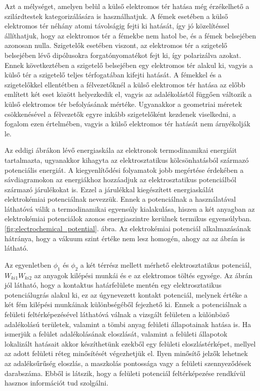Azt a mélységet, amelyen belül a külső elektromos tér hatása még érzékelhető a szilárdtestek kategorizálására is használhatjuk. A fémek esetében a külső elektromos tér néhány atomi távolságig fejti ki hatását, így jó közelítéssel állíthatjuk, hogy az elektromos tér a fémekbe nem hatol be, és a fémek belsejében azonosan nulla. Szigetelők esetében viszont, az elektromos tér a szigetelő belsejében lévő dipólusokra forgatónyomatékot fejt ki, így polarizálva azokat. Ennek következtében a szigetelő belsejében egy elektromos tér alakul ki, vagyis a külső tér a szigetelő teljes térfogatában kifejti hatását. A fémekkel és a szigetelőkkel ellentétben a félvezetőknél a külső elektromos tér hatása az előbb említett két eset között helyezkedik el, vagyis az adalékolástól függően változik a külső elektromos tér befolyásának mértéke. Ugyanakkor a geometriai méretek csökkenésével a félvezetők egyre inkább szigetelőként kezdenek viselkedni, a fogalom ezen értelmében, vagyis a külső elektromos tér hatását nem árnyékolják le.

Az eddigi ábrákon lévő energiaskála az elektronok termodinamikai energiáit tartalmazta, ugyanakkor kihagyta az elektrosztatikus kölcsönhatásból származó potenciális energiát. A kiegyenlítődési folyamatok jobb megértése érdekében a sávdiagramokon az energiákhoz hozzáadjuk az elektrosztatikus potenciálból származó járulékokat is. Ezzel a járulékkal kiegészített energiaskálát elektrokémiai potenciálnak nevezzük. Ennek a potenciálnak a használatával láthatóvá válik a termodinamikai egyensúly kialakulása, hiszen a két anyagban az elektrokémiai potenciálok azonos energiaszintre kerülnek termikus egyensúlyban. \ref{fig:electrochemical_potential}. ábra. Az elektrokémiai potenciál alkalmazásának hátránya, hogy a vákuum szint értéke nem lesz homogén, ahogy az az ábrán is látható.



Az egyenletben $\phi_1$ és $\phi_2$ a két térrész mellett mérhető elektrosztatikus potenciál, $W_{ki1} W_{ki2}$ az anyagok kilépési munkái és e az elektromos töltés egysége. Az ábrán jól látható, hogy a kontaktus határfelülete mentén egy elektrosztatikus potenciálugrás alakul ki, ez az úgynevezett kontakt potenciál, melynek értéke a két fém kilépési munkáinak különbségéből fejezhető ki. Ennek a potenciálnak a felületi feltérképezésével láthatóvá válnak a vizsgált felületen a különböző adalékolású területek, valamint a tömbi anyag felületi állapotainak hatása is.\cite{surface_states} Ha ismerjük a felület adalékolásának eloszlását, valamint a felületi állapotok lokalizált hatásait akkor készíthetünk ezekből egy felületi eloszlástérképet, mellyel az adott felületi réteg minősítését végezhetjük el. Ilyen minősítő jelzők lehetnek az adaléksűrűség eloszlás, a maszkolás pontossága vagy a felületi szennyeződések darabszáma. Ebből is látszik, hogy a felületi potenciál feltérképezése rendkívül hasznos információt tud szolgálni.


